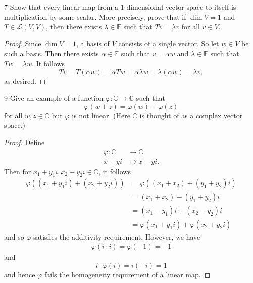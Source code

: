 \documentclass[11pt]{extarticle}
\newenvironment{problem}[1]{\begin{prob*}{#1}{}}{\end{prob*}}
\newcommand{\C}{\mathbb{C}}
\newcommand{\F}{\mathbb{F}}
\newcommand{\Hom}{\mathcal{L}}
\begin{document}
\begin{problem}{7}
Show that every linear map from a $1$-dimensional vector space to itself is multiplication by some scalar.  More precisely, prove that if $\dim V= 1$ and $T\in\Hom(V,V)$, then there exists $\lambda\in\F$ such that $Tv = \lambda v$ for all $v\in V$.
\end{problem}
\begin{proof}
Since $\dim V = 1$, a basis of $V$ consists of a single vector.  So let $w\in V$ be such a basis.  Then there exists $\alpha\in\F$ such that $v = \alpha w$ and $\lambda\in \F$ such that $Tw = \lambda w$.  It follows
\begin{equation*}
Tv = T(\alpha w) = \alpha Tw = \alpha\lambda w = \lambda(\alpha w) = \lambda v,
\end{equation*}
as desired.
\end{proof}

\begin{problem}{9}
Give an example of a function $\varphi:\C\to\C$ such that 
\begin{equation*}
\varphi(w + z) = \varphi(w) + \varphi(z)
\end{equation*}
for all $w,z\in\C$ but $\varphi$ is not linear.  (Here $\C$ is thought of as a complex vector space.)
\end{problem}
\begin{proof}
Define 
\begin{align*}
\varphi:\C&\to\C\\
       x + yi &\mapsto x - yi.
\end{align*}
Then for $x_1 + y_1i, x_2 + y_2i\in\C$, it follows
\begin{align*}
\varphi((x_1 + y_1i) + (x_2 + y_2i)) &= \varphi((x_1 + x_2) + (y_1 + y_2)i)\\
&= (x_1 + x_2) - (y_1 + y_2)i\\
&= (x_1 - y_1)i + (x_2 - y_2)i\\
&= \varphi(x_1 + y_1i) + \varphi(x_2 + y_2i)
\end{align*}
and so $\varphi$ satisfies the additivity requirement.  However, we have
\begin{align*}
\varphi(i\cdot i) = \varphi(-1) = -1
\end{align*}
and 
\begin{equation*}
i\cdot\varphi(i) = i(-i) = 1
\end{equation*}
and hence $\varphi$ fails the homogeneity requirement of a linear map.
\end{proof}
\end{document}
